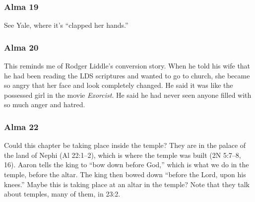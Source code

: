 	\subsubsection{Alma 19} %
	
		\begin{compactdesc}
		
		\item[30$\vert$]
		\begin{compactdesc}
		\item[she clasped her hands] See Yale, where it's ``clapped her hands.''
		\end{compactdesc}
		
		\end{compactdesc}

	\subsubsection{Alma 20} %

		\begin{compactdesc}

		\item[13$\vert$]
		\begin{compactdesc}
		\item[to his astonishment, his father was angry with him] This reminds me of Rodger Liddle's conversion story. When he told his wife that he had been reading the LDS scriptures and wanted to go to church, she became so angry that her face and look completely changed. He said it was like the possessed girl in the movie \textit{Exorcist}. He said he had never seen anyone filled with so much anger and hatred.
		\end{compactdesc}

		\end{compactdesc}

	\subsubsection{Alma 22} %

		Could this chapter be taking place inside the temple? They are in the palace of the land of Nephi (Al 22:1--2), which is where the temple was built (2N 5:7--8, 16). Aaron tells the king to ``bow down before God,'' which is what we do in the temple, before the altar. The king then bowed down ``before the Lord, upon his knees.'' Maybe this is taking place at an altar in the temple? Note that they talk about temples, many of them, in 23:2.

